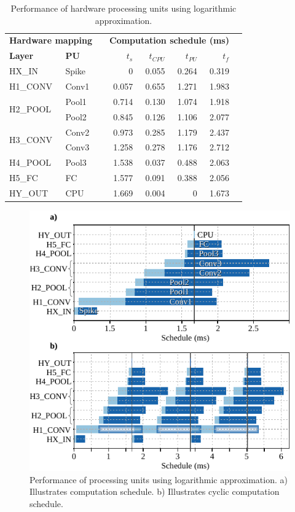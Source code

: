 \begin{table}[t!]\centering
	\caption{Performance of hardware processing units using logarithmic approximation.}\label{tab:latency_log}
	\scriptsize
	\begin{tabular}{llrrrrrr}\toprule
		\multicolumn{2}{c}{\textbf{Hardware mapping}} & &\multicolumn{4}{c}{\textbf{Computation schedule (ms)}} \\\cmidrule{1-2}\cmidrule{4-7}
		\textbf{Layer} &\textbf{PU} & &$t_s$ &$t_{CPU}$ &$t_{PU}$ &$t_f$ \\\midrule
		HX\_IN &Spike & &0 &0.055 &0.264 &0.319 \\
		H1\_CONV &Conv1 & &0.057 &0.655 &1.271 &1.983 \\
		\multirow{2}{*}{H2\_POOL} &Pool1 & &0.714 &0.130 &1.074 &1.918 \\
		&Pool2 & &0.845 &0.126 &1.106 &2.077 \\
		\multirow{2}{*}{H3\_CONV} &Conv2 & &0.973 &0.285 &1.179 &2.437 \\
		&Conv3 & &1.258 &0.278 &1.176 &2.712 \\
		H4\_POOL &Pool3 & &1.538 &0.037 &0.488 &2.063 \\
		H5\_FC &FC & &1.577 &0.091 &0.388 &2.056 \\
		HY\_OUT &CPU & &1.669 &0.004 &0 &1.673 \\
		\bottomrule
	\end{tabular}
\end{table}

\begin{figure}[!t]
	\centering
	\includegraphics[width=1\columnwidth]{../figures/latency_log_cycle.pdf}
	\caption{Performance of processing units using logarithmic approximation. a) Illustrates computation schedule. b) Illustrates cyclic computation schedule.}
	\label{fig:latency_pu_log_cycle}
\end{figure}

